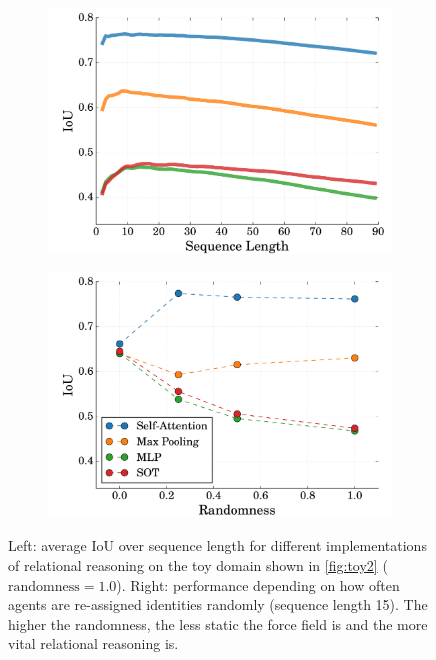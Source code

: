 \begin{figure}
    \centering
    \begin{subfigure}[c]{0.49\linewidth}
        \centering
        \includegraphics[width=\linewidth]{figures/MOHART/toy_iou_over_timesteps}
    \end{subfigure}
    \begin{subfigure}[c]{0.49\linewidth}
        \centering
        \includegraphics[width=\linewidth]{figures/MOHART/dial}
    \end{subfigure}
    \caption{
        Left: average IoU over sequence length for different implementations of relational reasoning on the toy domain shown in \cref{fig:toy2} ($\text{randomness} = 1.0$). Right: performance depending on how often agents are re-assigned identities randomly (sequence length 15). The higher the randomness, the less static the force field is and the more vital relational reasoning is. 
    }
    \label{fig:toy_quant}
\end{figure}

